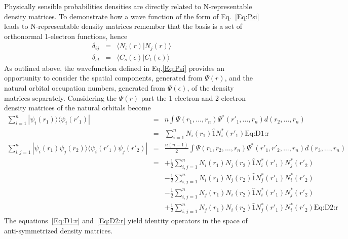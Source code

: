 \documentclass[pra,nofootinbib]{revtex4-1}
\newcommand{\dlabel}[1]{\text{#1}\label{#1}}
\begin{document}
Physically sensible probabilities densities are directly related to N-representable
density matrices. To demonstrate how a wave function of the form of Eq.~\ref{Eq:Psi}
leads to N-representable density matrices remember that the basis is a set of
orthonormal 1-electron functions, hence
\begin{eqnarray}
   \delta_{ij} &=& \langle N_i(r)        | N_j(r)        \rangle \\
   \delta_{st} &=& \langle C_s(\epsilon) | C_t(\epsilon) \rangle
\end{eqnarray}
As outlined above, the wavefunction defined in Eq.\ref{Eq:Psi} provides an opportunity
to consider the spatial components, generated from $\Psi(r)$, and the
natural orbital occupation numbers,
generated from $\Psi(\epsilon)$, of the density matrices separately. 
Considering the $\Psi(r)$ part the 1-electron and 2-electron 
density matrices of the natural orbitals become
\begin{eqnarray}
  \sum_{i=1}^{n} |\psi_i(r_1)\rangle \langle\psi_i(r'_1)|
  &=& n \int\Psi(r_1,\ldots,r_n)\Psi^*(r'_1,\ldots,r_n) d(r_2,\ldots,r_n) \\
  &=& \sum_{i=1}^{n} N_i(r_1) \hat{1} N_i^*(r'_1) \dlabel{Eq:D1:r} \\
  \sum_{i,j=1}^{n} |\psi_i(r_1)\psi_j(r_2)\rangle \langle\psi_i(r'_1)\psi_j(r'_2)| 
  &=& \frac{n(n-1)}{2}\int\Psi(r_1,r_2,\ldots,r_n)\Psi^*(r'_1,r'_2,\ldots,r_n) d(r_3,\ldots,r_n) \\
  &=&+\frac{1}{2}\sum_{i,j=1}^{n} N_i(r_1)N_j(r_2) \hat{1} N_i^*(r'_1)N_j^*(r'_2) \nonumber \\
  &&- \frac{1}{2}\sum_{i,j=1}^{n} N_i(r_1)N_j(r_2) \hat{1} N_j^*(r'_1)N_i^*(r'_2) \nonumber \\
  &&- \frac{1}{2}\sum_{i,j=1}^{n} N_j(r_1)N_i(r_2) \hat{1} N_i^*(r'_1)N_j^*(r'_2) \nonumber \\
  &&+ \frac{1}{2}\sum_{i,j=1}^{n} N_j(r_1)N_i(r_2) \hat{1} N_j^*(r'_1)N_i^*(r'_2) \dlabel{Eq:D2:r}
\end{eqnarray}
The equations~\ref{Eq:D1:r} and~\ref{Eq:D2:r} yield identity operators in the space
of anti-symmetrized density matrices.
\end{document}
